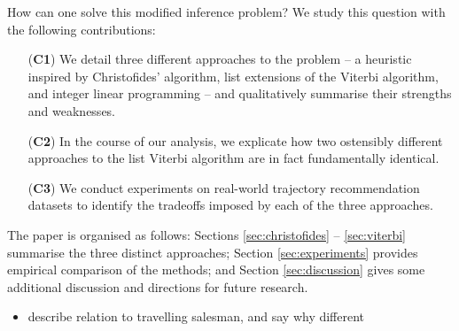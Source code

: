 How can one solve this modified inference problem?
We study this question with the following contributions:
\begin{enumerate}
	\item[(\textbf{C1})] We detail three different approaches to the problem -- a heuristic inspired by Christofides' algorithm, list extensions of the Viterbi algorithm, and integer linear programming -- and qualitatively summarise their strengths and weaknesses.
	\item[(\textbf{C2})] In the course of our analysis, we explicate how two ostensibly different approaches to the list Viterbi algorithm \citep{seshadri1994list,nilsson2001sequentially} are in fact fundamentally identical.
	\item[(\textbf{C3})] We conduct experiments on real-world trajectory recommendation datasets to identify the tradeoffs imposed by each of the three approaches.
\end{enumerate}

The paper is organised as follows:
Sections \ref{sec:christofides} -- \ref{sec:viterbi} summarise the three distinct approaches;
Section \ref{sec:experiments} provides empirical comparison of the methods;
and Section \ref{sec:discussion} gives some additional discussion and directions for future research.

\begin{itemize}
	\item describe relation to travelling salesman, and say why different
\end{itemize}
